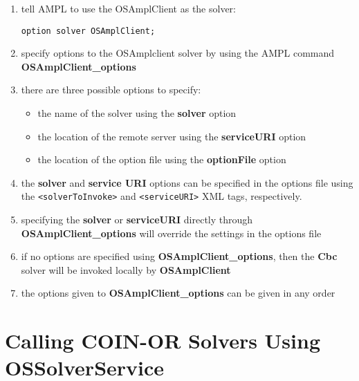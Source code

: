 \documentclass[11pt]{article}
\renewcommand{\{}{{\char"7B}}
\renewcommand{\}}{{\char"7D}}
\renewcommand{\^}{{\char"0D}}
\renewcommand{\'}{{\char"0D}}
\begin{document}
\begin{enumerate}
\item tell  AMPL to use the OSAmplClient as the solver:

\begin{verbatim}
option solver OSAmplClient;
\end{verbatim}

\item specify options to the OSAmplclient solver by using the AMPL command {\bf OSAmplClient\_options}

\item there are three possible options to specify:

\begin{itemize}

\item the name of the solver using the  {\bf solver} option

\item the location of the remote server using   the {\bf serviceURI} option

\item the location of the option file using  the {\bf optionFile} option

\end{itemize}

\item the {\bf solver} and {\bf service URI} options can be specified in the options file using the {\tt <solverToInvoke>} and {\tt <serviceURI>}  XML tags, respectively. 


\item specifying the {\bf solver} or {\bf serviceURI} directly through {\bf OSAmplClient\_options} will override the settings in the options file

\item if no options are specified using {\bf OSAmplClient\_options}, then the {\bf Cbc} solver will be invoked locally by {\bf OSAmplClient}

\item  the options given to {\bf OSAmplClient\_options}  can be given in any order



\end{enumerate}


\section{Calling COIN-OR  Solvers Using OSSolverService}\label{section:ossolverservice}
\end{document}
